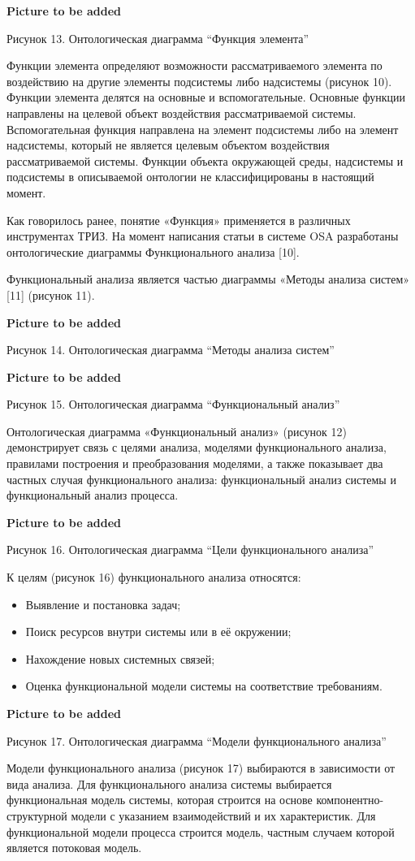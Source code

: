 \documentclass[11pt,a4paper]{article}
\newcommand{\addpicture}{\textbf{Picture to be added}\par}
\begin{document}
\begin{center}
  \addpicture
  Рисунок 13. Онтологическая диаграмма “Функция элемента”
\end{center}
Функции элемента определяют возможности рассматриваемого элемента по
воздействию на другие элементы подсистемы либо надсистемы (рисунок 10).
Функции элемента делятся на основные и вспомогательные. Основные функции
направлены на целевой объект воздействия рассматриваемой системы.
Вспомогательная функция направлена на элемент подсистемы либо на элемент
надсистемы, который не является целевым объектом воздействия рассматриваемой
системы. Функции объекта окружающей среды, надсистемы и подсистемы в
описываемой онтологии не классифицированы в настоящий момент.

Как говорилось ранее, понятие «Функция» применяется в различных инструментах
ТРИЗ. На момент написания статьи в системе OSA разработаны онтологические
диаграммы Функционального анализа [10].

Функциональный анализа является частью диаграммы «Методы анализа систем» [11]
(рисунок 11).
\begin{center}
  \addpicture
  Рисунок 14. Онтологическая диаграмма “Методы анализа систем”
\end{center}
\begin{center}
  \addpicture
  Рисунок 15. Онтологическая диаграмма “Функциональный анализ”
\end{center}
Онтологическая диаграмма «Функциональный анализ» (рисунок 12) демонстрирует
связь с целями анализа, моделями функционального анализа, правилами построения
и преобразования моделями, а также показывает два частных случая
функционального анализа: функциональный анализ системы и функциональный анализ
процесса.
\begin{center}
  \addpicture
  Рисунок 16. Онтологическая диаграмма “Цели функционального анализа”
\end{center}
К целям (рисунок 16) функционального анализа относятся:
\begin{itemize}[noitemsep]
\item Выявление и постановка задач;
\item Поиск ресурсов внутри системы или в её окружении;
\item Нахождение новых системных связей;
\item Оценка функциональной модели системы на соответствие требованиям.
\end{itemize}
\begin{center}
  \addpicture
  Рисунок 17. Онтологическая диаграмма “Модели функционального анализа”
\end{center}
Модели функционального анализа (рисунок 17) выбираются в зависимости от вида
анализа. Для функционального анализа системы выбирается функциональная модель
системы, которая строится на основе компонентно-структурной модели с указанием
взаимодействий и их характеристик. Для функциональной модели процесса строится
модель, частным случаем которой является потоковая модель.
\end{document}
